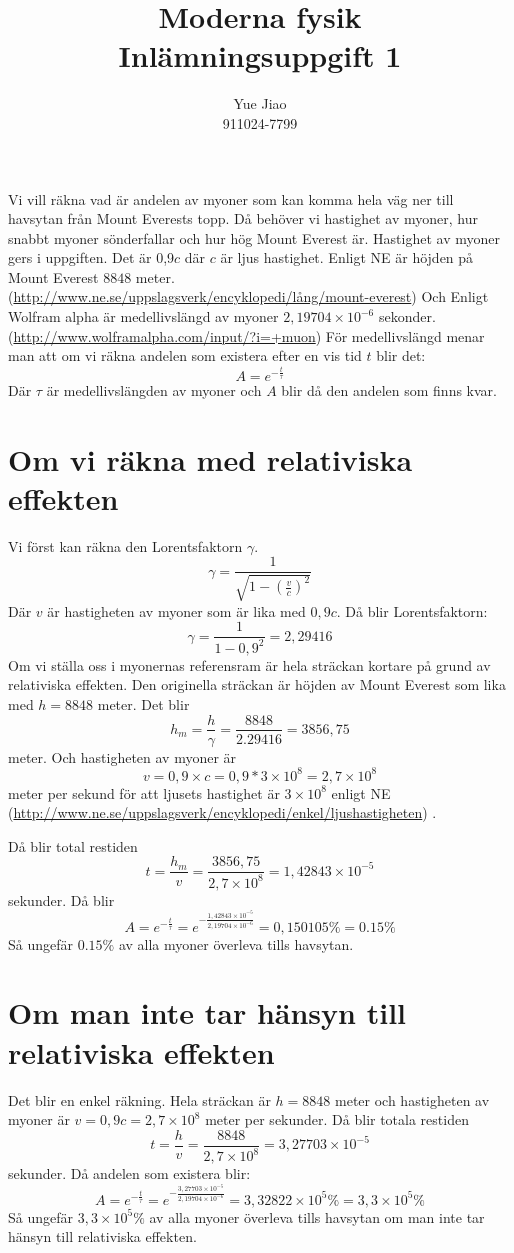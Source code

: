 \documentclass[a4paper,12pt]{article}
\author{Yue Jiao \\ 911024-7799}
\title{ {\Large \textbf{ Moderna fysik \\ Inlämningsuppgift 1} }}
\date{}
\begin{document}
\maketitle
Vi vill räkna vad är andelen av myoner som kan komma hela väg ner till havsytan från Mount Everests topp.
Då behöver vi hastighet av myoner, hur snabbt myoner sönderfallar och hur hög Mount Everest är.
Hastighet av myoner gers i uppgiften. Det är 0,9$c$ där $c$ är ljus hastighet.
Enligt NE är höjden på Mount Everest $8848$ meter.
(\url{http://www.ne.se/uppslagsverk/encyklopedi/lång/mount-everest})
Och Enligt Wolfram alpha är medellivslängd av myoner $2,19704\times 10^{-6}$ sekonder. 
(\url{http://www.wolframalpha.com/input/?i=+muon})
För medellivslängd menar man att om vi räkna andelen som existera efter en vis tid $t$ blir det:
$$A = e^{-\frac{t}{\tau}}$$
Där $\tau$ är medellivslängden av myoner och $A$ blir då den andelen som finns kvar. 

\section{Om vi räkna med relativiska effekten}
Vi först kan räkna den Lorentsfaktorn $\gamma$.
$$\gamma = \frac{1}{\sqrt{1-(\frac{v}{c})^2}}$$
Där $v$ är hastigheten av myoner som är lika med $0,9c$.
Då blir Lorentsfaktorn:
$$\gamma = \frac{1}{1-0,9^2} = 2,29416$$
Om vi ställa oss i myonernas referensram är hela sträckan kortare på grund av relativiska effekten.
Den originella sträckan är höjden av Mount Everest som lika med $h = 8848$ meter.
Det blir
$$h_m = \frac{h}{\gamma} = \frac{8848}{2.29416} = 3856,75$$
meter.
Och hastigheten av myoner är 
$$v = 0,9\times c = 0,9 * 3\times 10^8 = 2,7 \times 10^8$$ 
meter per sekund för att ljusets hastighet är $3\times 10^8$ enligt NE  
(\url{http://www.ne.se/uppslagsverk/encyklopedi/enkel/ljushastigheten}) .

Då blir total restiden 
$$t = \frac{h_m}{v} = \frac{3856,75}{2,7\times 10^8} = 1,42843\times 10^{-5}$$ 
sekunder. 
Då blir 
$$A = e^{-\frac{t}{\tau}} = e^{-\frac{1,42843\times 10^{-5}}{2,19704\times 10^{-6}}} = 0,150105\% = 0.15\%$$
Så ungefär $0.15\%$ av alla myoner överleva tills havsytan. 

\section{Om man inte tar hänsyn till relativiska effekten}
Det blir en enkel räkning.
Hela sträckan är $h = 8848$ meter och hastigheten av myoner är $v = 0,9c = 2,7\times 10^8$ meter per sekunder. 
Då blir totala restiden 
$$t = \frac{h}{v} = \frac{8848}{2,7\times10^8} = 3,27703\times10^{-5} $$
sekunder. 
Då andelen som existera blir:
$$A = e^{-\frac{t}{\tau}} = e^{-\frac{3,27703\times10^{-5}}{2,19704\times10^{-6}}} = 3,32822\times10^5\% = 3,3\times10^5\%$$ 
Så ungefär $3,3\times10^5\%$ av alla myoner överleva tills havsytan om man inte tar hänsyn till relativiska effekten.
\end{document}
